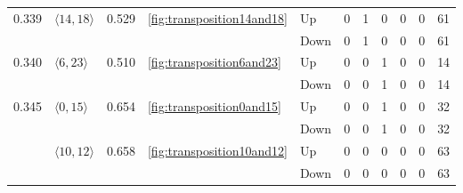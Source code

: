 \documentclass{article}
\begin{document}
\begin{center}
\begin{tabular}{lllllrrrrrr}
\cline{1-11} \cline{2-11} \cline{3-11} \cline{4-11}
\multirow[t]{2}{*}{0.339} & \multirow[t]{2}{*}{$\langle14, 18\rangle$} & \multirow[t]{2}{*}{0.529} & \multirow[t]{2}{*}{\ref{fig:transposition14and18}} & Up & 0 & 1 & 0 & 0 & 0 & 61 \\
 &  &  &  & Down & 0 & 1 & 0 & 0 & 0 & 61 \\
\cline{1-11} \cline{2-11} \cline{3-11} \cline{4-11}
\multirow[t]{2}{*}{0.340} & \multirow[t]{2}{*}{$\langle6, 23\rangle$} & \multirow[t]{2}{*}{0.510} & \multirow[t]{2}{*}{\ref{fig:transposition6and23}} & Up & 0 & 0 & 1 & 0 & 0 & 14 \\
 &  &  &  & Down & 0 & 0 & 1 & 0 & 0 & 14 \\
\cline{1-11} \cline{2-11} \cline{3-11} \cline{4-11}
\multirow[t]{4}{*}{0.345} & \multirow[t]{2}{*}{$\langle0, 15\rangle$} & \multirow[t]{2}{*}{0.654} & \multirow[t]{2}{*}{\ref{fig:transposition0and15}} & Up & 0 & 0 & 1 & 0 & 0 & 32 \\
 &  &  &  & Down & 0 & 0 & 1 & 0 & 0 & 32 \\
\cline{2-11} \cline{3-11} \cline{4-11}
 & \multirow[t]{2}{*}{$\langle10, 12\rangle$} & \multirow[t]{2}{*}{0.658} & \multirow[t]{2}{*}{\ref{fig:transposition10and12}} & Up & 0 & 0 & 0 & 0 & 0 & 63 \\
 &  &  &  & Down & 0 & 0 & 0 & 0 & 0 & 63 \\
\cline{1-11} \cline{2-11} \cline{3-11} \cline{4-11}
\bottomrule
\end{tabular}


\end{center}
\end{document}
